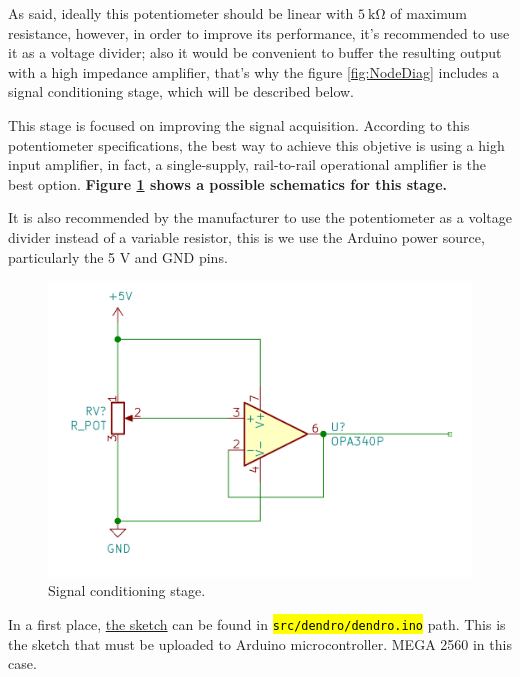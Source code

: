 \documentclass[11pt,a4paper,dvipsnames,twoside]{article}
\newcounter{subsubsubsection}[subsubsection]
\newcommand{\doubt}[1] {\textbf{\color{Red3}#1}}
\newcommand{\cmd}[1] {\hl{\texttt{#1}}}
\begin{document}
As said, ideally this potentiometer should be linear with $5\ \si{\kilo\ohm}$ of maximum resistance, however, in order to improve its performance, it's recommended to use it as a voltage divider; also it would be convenient to buffer the resulting output with a high impedance amplifier, that's why the figure \ref{fig:NodeDiag} includes a signal conditioning stage, which will be described below.

This stage is focused on improving the signal acquisition. According to this potentiometer specifications, the best way to achieve this objetive is using a high input amplifier, in fact, a single-supply, rail-to-rail operational amplifier is the best option. \doubt{Figure \ref{fig:SignalCond} shows a possible schematics for this stage.}

It is also recommended by the manufacturer to use the potentiometer as a voltage divider instead of a variable resistor, this is we use the Arduino power source, particularly the 5 \si{\volt} and GND pins.

\begin{figure}[htp]
  \centering
    \includegraphics[width=.9\textwidth]{../schemes/Signal_Conditioning.png}
  \caption{Signal conditioning stage.}
  \label{fig:SignalCond}
\end{figure}

In a first place, \href{https://github.com/WyRe/lora-arduino-dendrometer/blob/master/src/arduino/dendro/dendro.ino}{the sketch} can be found in \cmd{src/dendro/dendro.ino} path. This is the sketch that must be uploaded to Arduino microcontroller. MEGA 2560 in this case.
\end{document}
